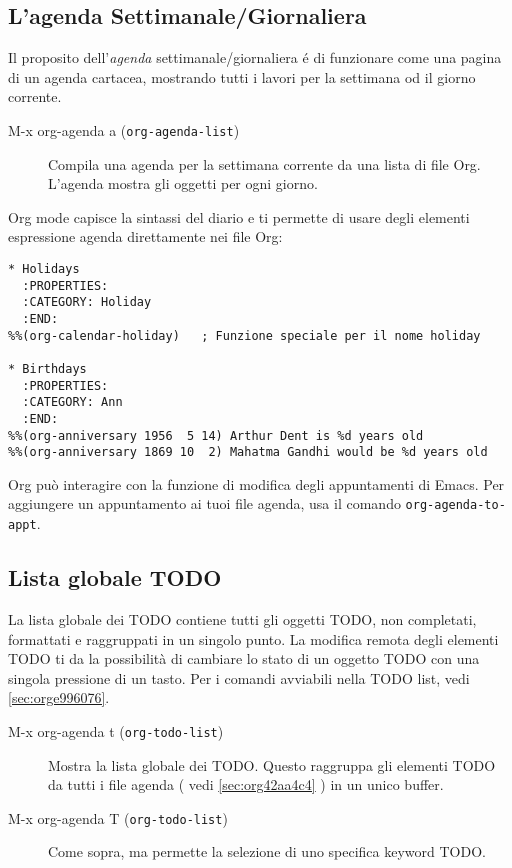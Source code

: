 \documentclass[11pt]{article}
\begin{document}
\subsection[Built-in Agenda Views]{L'agenda Settimanale/Giornaliera}
\label{sec:orgea3493d}
Il proposito dell'\emph{agenda} settimanale/giornaliera é di funzionare
come una pagina di un agenda cartacea, mostrando tutti i lavori per la
settimana od il giorno corrente.

\begin{description}
\item[{M-x org-agenda a (\texttt{org-agenda-list})}] Compila una agenda per la settimana corrente da una lista di file
Org. L'agenda mostra gli oggetti per ogni giorno.
\end{description}

Org mode capisce la sintassi del diario e ti permette di usare degli
elementi espressione agenda direttamente nei file Org:

\begin{verbatim}
* Holidays
  :PROPERTIES:
  :CATEGORY: Holiday
  :END:
%%(org-calendar-holiday)   ; Funzione speciale per il nome holiday

* Birthdays
  :PROPERTIES:
  :CATEGORY: Ann
  :END:
%%(org-anniversary 1956  5 14) Arthur Dent is %d years old
%%(org-anniversary 1869 10  2) Mahatma Gandhi would be %d years old
\end{verbatim}

Org può interagire con la funzione di modifica degli appuntamenti di
Emacs. Per aggiungere un appuntamento ai tuoi file agenda, usa il
comando \texttt{org-agenda-to-appt}.

\subsection[Global TODO List]{Lista globale TODO}
\label{sec:org07e6dd3}
La lista globale dei TODO contiene tutti gli oggetti TODO, non
completati, formattati e raggruppati in un singolo punto. La modifica
remota degli elementi TODO ti da la possibilità di cambiare lo stato
di un oggetto TODO con una singola pressione di un tasto. Per i
comandi avviabili nella TODO list, vedi \ref{sec:orge996076}.

\begin{description}
\item[{M-x org-agenda t (\texttt{org-todo-list})}] Mostra la lista globale dei TODO. Questo raggruppa gli elementi TODO
da tutti i file agenda ( vedi \ref{sec:org42aa4c4} ) in un unico
buffer.

\item[{M-x org-agenda T (\texttt{org-todo-list})}] Come sopra, ma permette la selezione di uno specifica keyword TODO.
\end{description}
\end{document}
